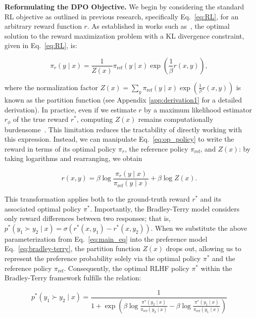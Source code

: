 \textbf{Reformulating the DPO Objective.} We begin by considering the standard RL objective as outlined in previous research, specifically Eq.~\ref{eq:RL}, for an arbitrary reward function $r$. As established in works such as~\citep{peters2007reinforcement, peng2019advantage, korbak2022reinforcement, go2023aligning}, the optimal solution to the reward maximization problem with a KL divergence constraint, given in Eq.~\ref{eq:RL}, is:

\begin{equation}\label{eq:op_policy}
    \pi_r(y\mid x) = \frac{1}{Z(x)}\pi_\text{ref}(y\mid x)\exp\left(\frac{1}{\beta}r(x, y)\right),
\end{equation}

where the normalization factor $Z(x) =\sum_{y}\pi_\text{ref}(y\mid x)\exp\left(\frac{1}{\beta}r(x, y)\right)$ is known as the partition function (see Appendix \ref{app:derivation1} for a detailed derivation). In practice, even if we estimate $r$ by a maximum likelihood estimator $r_{\phi}$ of the true reward $r^*$, computing $Z(x)$ remains computationally burdensome~\citep{korbak2022reinforcement, go2023aligning}. This limitation reduces the tractability of directly working with this expression. Instead, we can manipulate Eq.~\ref{eq:op_policy} to write the reward in terms of its optimal policy $\pi_r$, the reference policy $\pi_\text{ref}$, and $Z(x)$: by taking logarithms and rearranging, we obtain

\begin{equation}\label{eq:main_eq}
    r(x,y) =\beta \log \frac{\pi_r(y\mid x)}{\pi_\text{ref}(y\mid x)} + \beta \log Z(x).
\end{equation}

This transformation applies both to the ground-truth reward $r^*$ and its associated optimal policy $\pi^*$. Importantly, the Bradley-Terry model considers only reward differences between two responses; that is, $p^*(y_1 \succ y_2 \mid x) = \sigma(r^*(x, y_1) - r^*(x, y_2))$. When we substitute the above parameterization from Eq.~\ref{eq:main_eq} into the preference model Eq.~\ref{eq:bradley-terry}, the partition function $Z(x)$ drops out, allowing us to represent the preference probability solely via the optimal policy $\pi^*$ and the reference policy $\pi_\text{ref}$. Consequently, the optimal RLHF policy $\pi^*$ within the Bradley-Terry framework fulfills the relation:

\begin{equation}\label{eq:objective}
    p^*(y_1\succ y_2 \mid x)=\frac{1}{1 + \exp\left(\beta \log \frac{\pi^*(y_2\mid x)}{\pi_\text{ref}(y_2\mid x)} - \beta \log \frac{\pi^*(y_1\mid x)}{\pi_\text{ref}(y_1\mid x)}\right)}
\end{equation}

